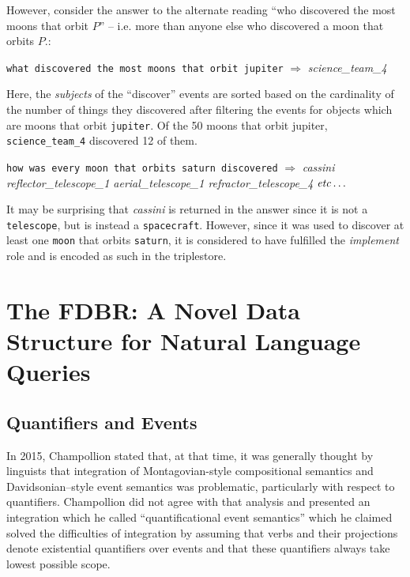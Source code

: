 \documentclass[../main.tex]{subfiles}
\begin{document}
\begin{refsection}
\examplespacing

\noindent However, consider the answer to the alternate reading ``who discovered the most moons that orbit $P$'' – i.e. more than anyone else who discovered a moon that orbits $P$.:

\examplespacing

\texttt{what discovered the most moons that orbit jupiter} \linebreak
$\Rightarrow$ \textit{science\_team\_4}

\examplespacing

\noindent Here, the \textit{subjects} of the ``discover'' events are sorted based on the cardinality of the number of things they discovered after filtering the events for objects which are moons that orbit \texttt{jupiter}.  Of the 50 moons that orbit jupiter, \linebreak \texttt{science\_team\_4} discovered 12 of them.

\examplespacing

\texttt{how was every moon that orbits saturn discovered} $\Rightarrow$ \textit{cassini \\ reflector\_telescope\_1 aerial\_telescope\_1 refractor\_telescope\_4} $\operatorname{\mathit{etc\ldots}}$

\examplespacing

\noindent It may be surprising that \textit{cassini} is returned in the answer since it is not a \texttt{telescope}, but is instead a \texttt{spacecraft}.  However, since it was used to discover at least one \texttt{moon} that orbits \texttt{saturn}, it is considered to have fulfilled the \textit{implement} role and is encoded as such in the triplestore.

\section{The FDBR: A Novel Data Structure for Natural Language Queries}
\label{webist2019journal:album}

\subsection{Quantifiers and Events}
\label{webist2019journal:quant}
In 2015, Champollion \cite{champollion2015interaction} stated that, at that time, it was generally thought by linguists that integration of Montagovian-style compositional semantics and Davidsonian–style event semantics \cite{parsons1990events,davidson1967logical} was problematic, particularly with respect to quantifiers. Champollion did not agree with that analysis and presented an integration which he called ``quantificational event semantics'' which he claimed solved the difficulties of integration by assuming that verbs and their projections denote existential quantifiers over events and that these quantifiers always take lowest possible scope.


\end{refsection}
\end{document}

